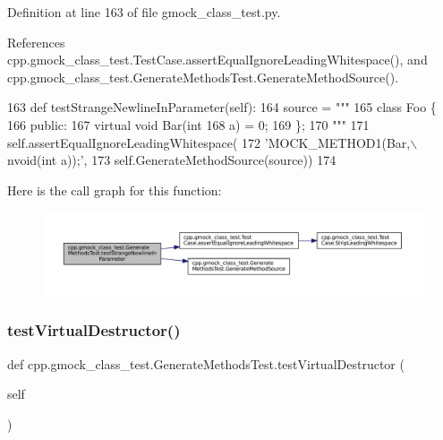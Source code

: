 Definition at line 163 of file gmock\+\_\+class\+\_\+test.\+py.



References cpp.\+gmock\+\_\+class\+\_\+test.\+Test\+Case.\+assert\+Equal\+Ignore\+Leading\+Whitespace(), and cpp.\+gmock\+\_\+class\+\_\+test.\+Generate\+Methods\+Test.\+Generate\+Method\+Source().


\begin{DoxyCode}
163   \textcolor{keyword}{def }testStrangeNewlineInParameter(self):
164     source = \textcolor{stringliteral}{"""}
165 \textcolor{stringliteral}{class Foo \{}
166 \textcolor{stringliteral}{ public:}
167 \textcolor{stringliteral}{  virtual void Bar(int}
168 \textcolor{stringliteral}{a) = 0;}
169 \textcolor{stringliteral}{\};}
170 \textcolor{stringliteral}{"""}
171     self.assertEqualIgnoreLeadingWhitespace(
172         \textcolor{stringliteral}{'MOCK\_METHOD1(Bar,\(\backslash\)nvoid(int a));'},
173         self.GenerateMethodSource(source))
174 
\end{DoxyCode}
Here is the call graph for this function\+:
\nopagebreak
\begin{figure}[H]
\begin{center}
\leavevmode
\includegraphics[width=350pt]{classcpp_1_1gmock__class__test_1_1GenerateMethodsTest_a184995b077a46f3408fa203cb0626614_cgraph}
\end{center}
\end{figure}
\mbox{\label{classcpp_1_1gmock__class__test_1_1GenerateMethodsTest_a3095f7046a089b3c8a13e7e8161a2ab2}} 
\subsubsection{\texorpdfstring{test\+Virtual\+Destructor()}{testVirtualDestructor()}}
{\footnotesize\ttfamily def cpp.\+gmock\+\_\+class\+\_\+test.\+Generate\+Methods\+Test.\+test\+Virtual\+Destructor (\begin{DoxyParamCaption}\item[{}]{self }\end{DoxyParamCaption})}



